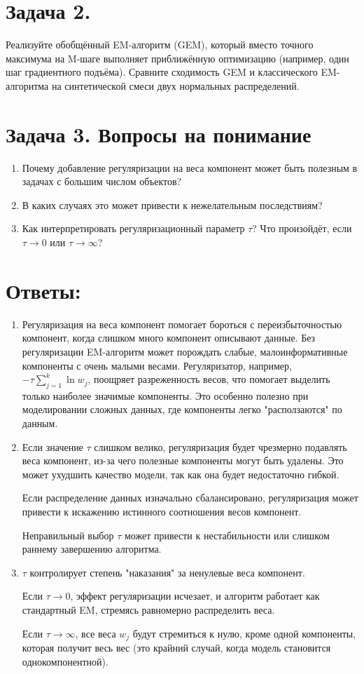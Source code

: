 \section*{\textbf{Задача 2.}} Реализуйте обобщённый EM-алгоритм (GEM), который вместо точного максимума на M-шаге выполняет приближённую оптимизацию (например, один шаг градиентного подъёма). Сравните сходимость GEM и классического EM-алгоритма на синтетической смеси двух нормальных распределений.

\section*{\textbf{Задача 3.} Вопросы на понимание}
\begin{enumerate}
    \item Почему добавление регуляризации на веса компонент может быть полезным в задачах с большим числом объектов?
    \item В каких случаях это может привести к нежелательным последствиям?
    \item Как интерпретировать регуляризационный параметр $\tau$? Что произойдёт, если $\tau \to 0$ или $\tau \to \infty$?
\end{enumerate}

\section*{\textbf{Ответы:}}
\begin{enumerate}
    \item Регуляризация на веса компонент помогает бороться с переизбыточностью компонент, когда слишком много компонент описывают данные. Без регуляризации EM-алгоритм может порождать слабые, малоинформативные компоненты с очень малыми весами. Регуляризатор, например, $-\tau \sum\limits_{j=1}^k \ln w_j$, поощряет разреженность весов, что помогает выделить только наиболее значимые компоненты. Это особенно полезно при моделировании сложных данных, где компоненты легко "расползаются" по данным.
    \item Если значение $\tau$ слишком велико, регуляризация будет чрезмерно подавлять веса компонент, из-за чего полезные компоненты могут быть удалены. Это может ухудшить качество модели, так как она будет недостаточно гибкой.

    Если распределение данных изначально сбалансировано, регуляризация может привести к искажению истинного соотношения весов компонент.

    Неправильный выбор $\tau$ может привести к нестабильности или слишком раннему завершению алгоритма.
    \item $\tau$ контролирует степень "наказания" за ненулевые веса компонент.

    Если $\tau \to 0$, эффект регуляризации исчезает, и алгоритм работает как стандартный EM, стремясь равномерно распределить веса.

    Если $\tau \to \infty$, все веса $w_j$ будут стремиться к нулю, кроме одной компоненты, которая получит весь вес (это крайний случай, когда модель становится однокомпонентной).
\end{enumerate}

